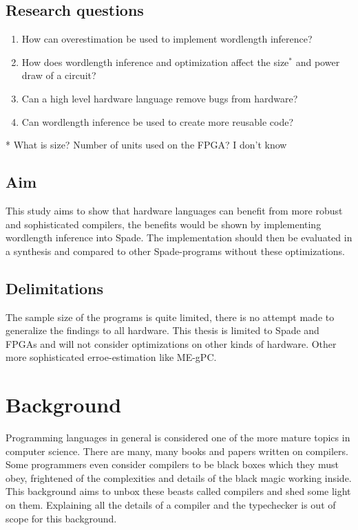 \documentclass[msc,lith,english]{liuthesis}
\begin{document}
\section{Research questions}
\begin{enumerate}
  \item How can overestimation be used to implement wordlength inference?
  \item How does wordlength inference and optimization affect the size${}^{*}$ and power draw of a circuit?
  \item Can a high level hardware language remove bugs from hardware?
  \item Can wordlength inference be used to create more reusable code?
\end{enumerate}
* What is size? Number of units used on the FPGA? I don't know


\section{Aim}
This study aims to show that hardware languages can benefit from more robust and sophisticated compilers, the benefits would be shown by implementing wordlength inference into Spade. The implementation should then be evaluated in a synthesis and compared to other Spade-programs without these optimizations.

\section{Delimitations}
The sample size of the programs is quite limited, there is no attempt made to generalize the findings to all hardware. This thesis is limited to Spade and FPGAs and will not consider optimizations on other kinds of hardware. Other more sophisticated erroe-estimation like ME-gPC.

\chapter{Background}
\label{chaBackground}
Programming languages in general is considered one of the more mature topics in computer science. There are many, many books and papers written on compilers. Some programmers even consider compilers to be black boxes which they must obey, frightened of the complexities and details of the black magic working inside. This background aims to unbox these beasts called compilers and shed some light on them. Explaining all the details of a compiler and the typechecker is out of scope for this background.
\end{document}
